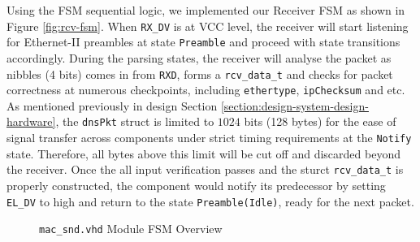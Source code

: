 \documentclass[a4paper]{report}
\newcommand{\code}{\texttt}
\begin{document}
Using the FSM sequential logic, we implemented our Receiver FSM as shown in Figure \ref{fig:rcv-fsm}. When \code{RX\_DV} is at VCC level, the receiver will start listening for Ethernet-II preambles at state \code{Preamble} and proceed with state transitions accordingly. During the parsing states, the receiver will analyse the packet as nibbles (4 bits) comes in from \code{RXD}, forms a \code{rcv\_data\_t} and checks for packet correctness at numerous checkpoints, including \code{ethertype}, \code{ipChecksum} and etc. As mentioned previously in design Section \ref{section:design-system-design-hardware}, the \code{dnsPkt} struct is limited to $1024$ bits (128 bytes) for the ease of signal transfer across components under strict timing requirements at the \code{Notify} state. Therefore, all bytes above this limit will be cut off and discarded beyond the receiver. Once the all input verification passes and the sturct \code{rcv\_data\_t} is properly constructed, the component would notify its predecessor by setting \code{EL\_DV} to high and return to the state \code{Preamble(Idle)}, ready for the next packet.

\begin{figure}[h!]
  \caption{\code{mac\_snd.vhd} Module FSM Overview}
  \label{fig:snd-fsm}
\end{figure}
\end{document}
